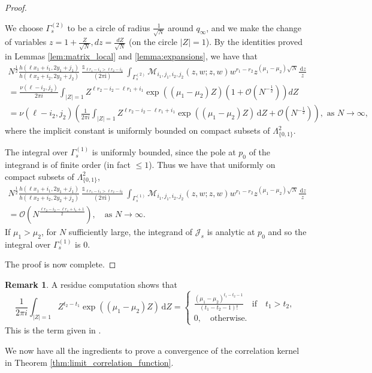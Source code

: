\documentclass[11pt]{article}
\theoremstyle{plain}
\theoremstyle{definition}
\newtheorem{remark}[theorem]{Remark}
\numberwithin{equation}{section}
\renewcommand{\d}{\,\mathrm{d}}
\renewcommand{\i}{\mathrm{i}}
\DeclareMathOperator{\one}{\mathds{1}}
\begin{document}
\begin{proof}
\begin{enumerate}
%
%
 We choose  $\Gamma_s^{(2)}$ to be a circle of radius $\frac{1}{\sqrt{N}}$ around $q_{\infty}$, and we make the change of variables $z=1+\frac{Z}{\sqrt{N}}, dz=\frac{dZ}{\sqrt{N}}$ (on the circle $|Z|=1$). By the identities proved in Lemmas \ref{lem:matrix_local} and \ref{lemma:expansions}, we have that
\begin{multline}
N^{\frac{1}{2}}
\frac{h(\ell x_1+i_1,2y_1+j_1)}{h(\ell x_2+i_2,2y_2+j_2)}
\frac{\one_{\ell r_1-i_1>\ell r_2-i_2}}{(2\pi\i)}\int_{ \Gamma_s^{(2)}}
\boldsymbol{\mathcal{M}}_{i_1,j_1,i_2,j_2}(z,w;z,w) 
w^{r_1-r_2}
z^{(\mu_1-\mu_2)\sqrt{N}}
\frac{\d z}{z}
%
%
\\=
%
\frac{\nu(\ell-i_2,j_2)}{2\pi i}
%
\int_{|Z|=1} Z^{\ell r_2-i_2-\ell r_1+i_1}
\exp((\mu_1-\mu_2) Z)
 \left(1+\mathcal{O}(N^{-\frac{1}{2}})\right)dZ
\\= \nu(\ell-i_2,j_2)
%
\left(
 \frac{1}{2\pi i}\int_{|Z|=1} 
  Z^{\ell r_2-i_2-\ell r_1+i_1}
\exp((\mu_1-\mu_2) Z)
\d Z
+\mathcal{O}\left(N^{-\frac{1}{2}}\right)\right),
\text{  as  }
 N\rightarrow\infty,
  \end{multline}
where the implicit constant is uniformly bounded on compact subsets of $\Lambda_{\{0,1\}}^2$.


The integral over $\Gamma_s^{(1)}$ is uniformly bounded, since the pole at $p_0$ of the integrand is of finite order (in fact $\leq 1$). Thus we have that uniformly on compact subsets of $\Lambda_{\{0,1\}}^2$,
\begin{multline}\label{eqn:justify_last_line}
N^{\frac{1}{2}}
\frac{h(\ell x_1+i_1,2y_1+j_1)}{h(\ell x_2+i_2,2y_2+j_2)}
\frac{\one_{\ell r_1-i_1>\ell r_2-i_2}}{(2\pi\i)}\int_{ \Gamma_s^{(1)}}
\boldsymbol{\mathcal{M}}_{i_1,j_1,i_2,j_2}(z,w;z,w) 
w^{r_1-r_2}
z^{(\mu_1-\mu_2)\sqrt{N}}
\frac{\d z}{z}
\\=\mathcal{O}\left(N^{\frac{\ell r_2-i_2-\ell r_1+i_1+1}{2}}\right),\quad\text{as } N\rightarrow\infty.
\end{multline}
%
%
If $\mu_1>\mu_2$, for $N$ sufficiently large, the integrand of $\mathcal{J}_s$ is analytic at $p_0$ and so the integral over $\Gamma_s^{(1)}$ is 0.
\end{enumerate}
The proof is now complete.
% 
\end{proof}

\begin{remark}
A residue computation shows that
\begin{equation}
 \frac{1}{2\pi i}\int_{|Z|=1} 
  Z^{t_2-t_1}
\exp((\mu_1-\mu_2) Z)
\d Z
=
\begin{cases}
 \frac{(\mu_1-\mu_2)^{t_1-t_2-1}}{(t_1 - t_2-1)!}\quad\text{if}\quad t_1> t_2,
 \\ 0,\quad\text{otherwise.}
 \end{cases}
\end{equation}
This is the term given in \cite{OR06}.
\end{remark}
%
%
%
We now have all the ingredients to prove a convergence of the correlation kernel in Theorem \ref{thm:limit_correlation_function}. 
\end{document}
